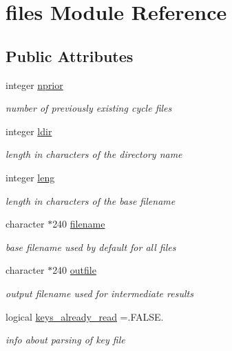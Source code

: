 \hypertarget{classfiles}{\section{files Module Reference}
\label{classfiles}
}
\subsection*{Public Attributes}
\begin{DoxyCompactItemize}
\item 
integer \hyperlink{classfiles_ac7f9a096a71e77d55c9a013df61bd110}{nprior}
\begin{DoxyCompactList}\small\item\em number of previously existing cycle files \end{DoxyCompactList}\item 
integer \hyperlink{classfiles_ae4d78338556f80825532a4a5bb1cdc5c}{ldir}
\begin{DoxyCompactList}\small\item\em length in characters of the directory name \end{DoxyCompactList}\item 
integer \hyperlink{classfiles_af9be68aa5c55ff7ddb877ea03560ccdc}{leng}
\begin{DoxyCompactList}\small\item\em length in characters of the base filename \end{DoxyCompactList}\item 
character $\ast$240 \hyperlink{classfiles_a7632b8d9d70c61339b73f9c214b9fca3}{filename}
\begin{DoxyCompactList}\small\item\em base filename used by default for all files \end{DoxyCompactList}\item 
character $\ast$240 \hyperlink{classfiles_a6462c022456a36144ec8a11250b87eeb}{outfile}
\begin{DoxyCompactList}\small\item\em output filename used for intermediate results \end{DoxyCompactList}\item 
logical \hyperlink{classfiles_a70170d340a05a63d29095c72f181334e}{keys\-\_\-already\-\_\-read} =.F\-A\-L\-S\-E.
\begin{DoxyCompactList}\small\item\em info about parsing of key file \end{DoxyCompactList}\end{DoxyCompactItemize}


